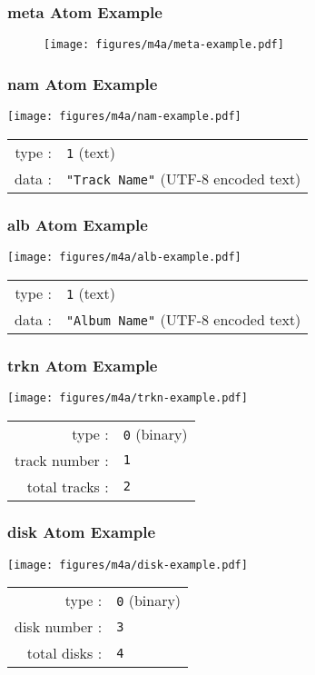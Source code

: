 \clearpage

\subsubsection{meta Atom Example}
\begin{figure}[h]
\texttt{[image: figures/m4a/meta-example.pdf]}
\end{figure}

\clearpage

\subsubsection{nam Atom Example}
\texttt{[image: figures/m4a/nam-example.pdf]}
\par
\noindent
\begin{tabular}{rl}
  type : & \texttt{1} (text) \\
  data : & \texttt{"Track Name"} (UTF-8 encoded text) \\
\end{tabular}

\subsubsection{alb Atom Example}
\texttt{[image: figures/m4a/alb-example.pdf]}
\par
\noindent
\begin{tabular}{rl}
  type : & \texttt{1} (text) \\
  data : & \texttt{"Album Name"} (UTF-8 encoded text) \\
\end{tabular}

\subsubsection{trkn Atom Example}
\texttt{[image: figures/m4a/trkn-example.pdf]}
\par
\noindent
\begin{tabular}{rl}
  type : & \texttt{0} (binary) \\
  track number : & \texttt{1} \\
  total tracks : & \texttt{2} \\
\end{tabular}

\subsubsection{disk Atom Example}
\texttt{[image: figures/m4a/disk-example.pdf]}
\par
\noindent
\begin{tabular}{rl}
  type : & \texttt{0} (binary) \\
  disk number : & \texttt{3} \\
  total disks : & \texttt{4} \\
\end{tabular}
